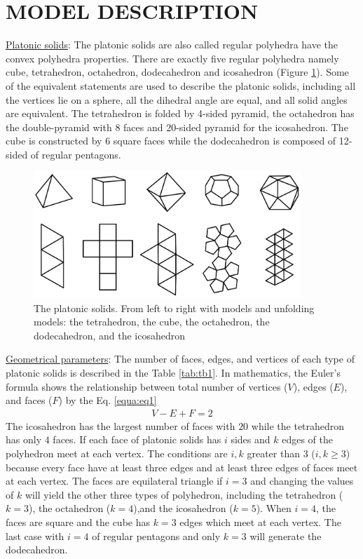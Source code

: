 \section{MODEL DESCRIPTION}
\label{sec:problemFormulation}
\noindent\uline{Platonic solids}:
The platonic solids are also called regular polyhedra have the convex polyhedra properties. 
There are exactly five regular polyhedra namely cube, tetrahedron, octahedron, dodecahedron and icosahedron (Figure \ref{fig:platonicSolids}). 
Some of the equivalent statements are used to describe the platonic solids, including all the vertices lie on a sphere, all the dihedral angle are equal, and all solid angles are equivalent. 
The tetrahedron is folded by 4-sided pyramid, the octahedron has the double-pyramid with $8$ faces and 20-sided pyramid for the icosahedron. The cube is constructed by $6$ square faces while the dodecahedron is composed of 12-sided of regular pentagons.\\

\begin{figure}[h]
\centering
	\includegraphics[width=0.9\textwidth]{image/5Platonic1.png}
	\caption{The platonic solids. From left to right with models and unfolding models: the tetrahedron, the cube, the octahedron, the dodecahedron, and the icosahedron}
	\label{fig:platonicSolids}
\end{figure}
%
% 
%
%
%
\noindent \uline{Geometrical parameters}: 
The number of faces, edges, and vertices of each type of platonic solids is described in the Table \ref{tab:tb1}. 
In mathematics, the Euler's formula shows the relationship between total number of vertices ($V$), edges ($E$), and faces ($F$) by the Eq. \ref{equa:eq1}
%
\begin{equation} 
\label{equa:eq1}
\begin{split}
V-E+F=2
\end{split}
\end{equation}
% 
The icosahedron has the largest number of faces with $20$ while the tetrahedron has only $4$ faces. 
If each face of platonic solids has $i$ sides and $k$ edges of the polyhedron meet at each vertex.
The conditions are $i,k$ greater than $3$ ($i,k\geq3$) because every face have at least three edges and at least three edges of faces meet at each vertex.
The faces are equilateral triangle if $i=3$ and changing the values of $k$ will yield the other three types of polyhedron, including the tetrahedron ($k=3$), the octahedron ($k=4$),and the icosahedron ($k=5$). When $i=4$, the faces are square and the cube has $k=3$ edges which meet at each vertex. The last case with $i=4$ of regular pentagons and only $k=3$ will generate the dodecahedron. \\

